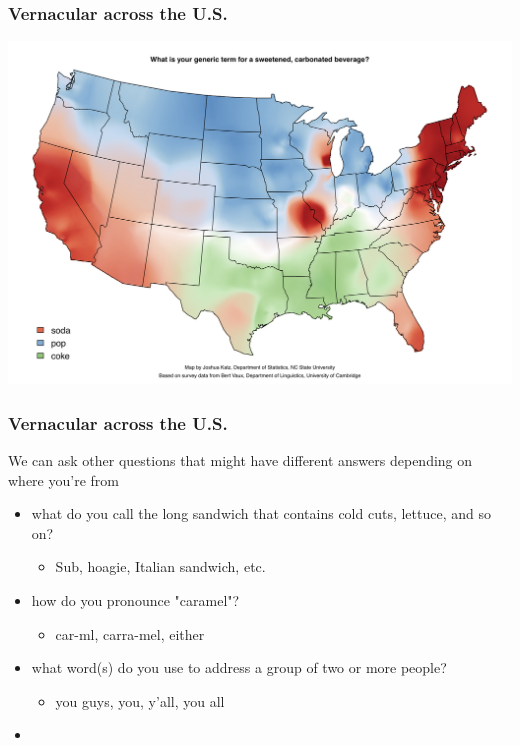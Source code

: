 \documentclass{beamer} %
\newcommand{\1}{\mathbb{1}}
\begin{document}
\begin{frame}[t]\frametitle{Vernacular across the U.S.}
\includegraphics[scale = 0.4]{./visualization/sodapopcoke.png}
\end{frame}

\begin{frame}[t]\frametitle{Vernacular across the U.S.}
We can ask other questions that might have different answers depending on where you're from
\begin{itemize}
	\item  what do you call the long sandwich that contains cold cuts, lettuce, and so on?
	\begin{itemize}
		\item Sub, hoagie, Italian sandwich, etc.
	\end{itemize}
	\item how do you pronounce "caramel"?
	\begin{itemize}
		\item car-ml, carra-mel, either
	\end{itemize}	
	\item what word(s) do you use to address a group of two or more people?
	\begin{itemize}
		\item you guys, you, y'all, you all
	\end{itemize}	
	\item[]
\end{itemize}
\href{http://www4.uwm.edu/FLL/linguistics/dialect/maps.html}{}

\end{frame}
\end{document}
